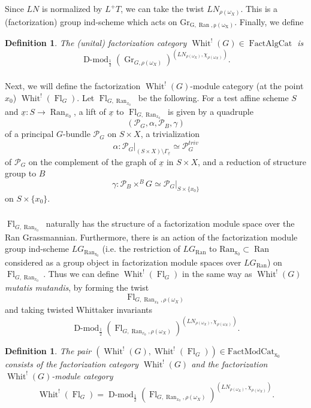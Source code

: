 \documentclass[10pt]{amsart}
\newtheorem{defn}[subsubsection]{Definition}
\theoremstyle{remark}
\newcommand{\on}[1]{\operatorname{#1}}
\newcommand{\Dmod}{\on{D-mod}}
\newcommand{\FactAlgCat}{\on{FactAlgCat}}
\newcommand{\FactModCat}{\on{FactModCat_{x_0}}}
\newcommand{\sssec}[1]{\subsubsection{}}
\begin{document}
Since $LN$ is normalized by $L^+T$, we can take the twist $LN_{\rho(\omega_X)}$. This is a (factorization) group ind-scheme which acts on $\on{Gr_{G, \on{Ran}, \rho(\omega_X)}}$. Finally, we define

\begin{defn}
    The (unital) factorization category $\on{Whit}^!(G) \in \FactAlgCat$ is
    $$
    \Dmod_{\frac{1}{2}}(\on{Gr}_{G, \rho(\omega_X)})^{(LN_{\rho(\omega_X)}, \chi_{\rho(\omega_X)})} .
    $$
\end{defn}

\sssec{}
Next, we will define the factorization $\on{Whit}^!(G)$-module category (at the point $x_0$) $\on{Whit}^!(\on{Fl}_G)$. Let $\on{Fl}_{G, \on{Ran}_{x_0}}$ be the following. For a test affine scheme $S$ and $\underline{x} : S \to \on{Ran}_{x_0}$, a lift of $\underline{x}$ to $\on{Fl}_{G, \on{Ran}_{x_0}}$ is given by a quadruple
$$
    (\mathcal{P}_G, \alpha, \mathcal{P}_B, \gamma)
$$
of a principal $G$-bundle $\mathcal{P}_G$ on $S \times X$, a trivialization
$$
\alpha: \mathcal{P}_G|_{(S \times X) \setminus \Gamma_{\underline{x}}} \simeq \mathcal{P}_G^{triv}
$$
of $\mathcal{P}_G$ on the complement of the graph of $\underline{x}$ in $S \times X$, and a reduction of structure group to $B$
$$
\gamma : \mathcal{P}_B \times^B G \simeq \mathcal{P}_G|_{S \times \{x_0\}}
$$
on $S \times \{x_0\}$.

\sssec{}
$\on{Fl}_{G, \on{Ran}_{x_0}}$ naturally has the structure of a factorization module space over the Ran Grassmannian. Furthermore, there is an action of the factorization module group ind-scheme $LG_{\on{Ran_{x_0}}}$ (i.e. the restriction of $LG_{\on{Ran}}$ to $\on{Ran_{x_0}} \subset \on{Ran}$ considered as a group object in factorization module spaces over $LG_{\on{Ran}}$) on $\on{Fl}_{G, \on{Ran}_{x_0}}$. Thus we can define $\on{Whit}^!(\on{Fl}_G)$ in the same way as $\on{Whit}^!(G)$ \emph{mutatis mutandis}, by forming the twist
$$
\on{Fl}_{G, \on{Ran}_{x_0}, \rho(\omega_X)}
$$
and taking twisted Whittaker invariants
$$
\Dmod_{\frac{1}{2}}(\on{Fl}_{G, \on{Ran}_{x_0}, \rho(\omega_X)})^{(LN_{\rho(\omega_X)}, \chi_{\rho(\omega_X)})}.
$$

\begin{defn}
    The pair $(\on{Whit}^!(G), \on{Whit}^!(\on{Fl}_G)) \in \FactModCat$ consists of the factorization category $\on{Whit}^!(G)$ and the factorization $\on{Whit}^!(G)$-module category 
    $$
    \on{Whit}^!(\on{Fl}_G) = \Dmod_{\frac{1}{2}}(\on{Fl}_{G, \on{Ran}_{x_0}, \rho(\omega_X)})^{(LN_{\rho(\omega_X)}, \chi_{\rho(\omega_X)})} .
    $$
\end{defn}
\end{document}
